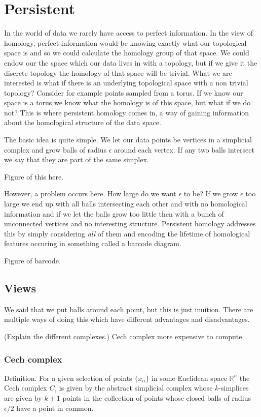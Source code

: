 \chapter{Persistent}
In the world of data we rarely have access to perfect information. In the view of homology, perfect information would be knowing exactly what our topological space is and so we could calculate the homology group of that space. We could endow our the space which our data lives in with a topology, but if we give it the discrete topology the homology of that space will be trivial. What we are interested is what if there is an underlying topological space with a non trivial topology? Consider for example points sampled from a torus. If we know our space is a torus we know what the homology is of this space, but what if we do not? This is where persistent homology comes in, a way of gaining information about the homological structure of the data space.

The basic idea is quite simple. We let our data points be vertices in a simplicial complex and grow balls of radius $\epsilon$ around each vertex. If any two balls intersect we say that they are part of the same simplex.

Figure of this here.

However, a problem occurs here. How large do we want $\epsilon$ to be? If we grow $\epsilon$ too large we end up with all balls intersecting each other and with no homological information and if we let the balls grow too little then with a bunch of unconnected vertices and no interesting structure. Persistent homology addresses this by simply considering \textit{all} of them and encoding the lifetime of homological features occuring in something called a barcode diagram.

Figure of barcode.


\section{Views}
We said that we put balls around each point, but this is just inuition. There are multiple ways of doing this which have different advantages and disadvantages.

(Explain the different complexes.)
Cech complex more expensive to compute.
\subsection{Cech complex}
Definition. For a given selection of points $\{x_{\alpha}\}$ in some Euclidean space $\mathbb{R}^{n}$ the Cech complex $C_{\epsilon}$ is given by the abstract simplicial complex whose $k$-simplices are given by $k+1$ points in the collection of points whose closed balls of radius $\epsilon/2$ have a point in common.
